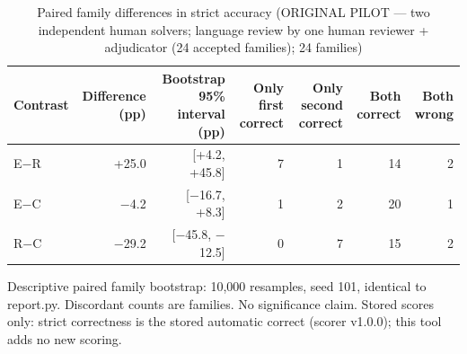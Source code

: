 \begin{table}[t]
\centering
\small
\caption{Paired family differences in strict accuracy (ORIGINAL PILOT --- two independent human solvers; language review by one human reviewer + adjudicator (24 accepted families); 24 families)}
\label{tab:pilotorig-Llama-3.2-3B-Instruct-paired}
\begin{tabular}{lrrrrrr}
\toprule
Contrast & Difference (pp) & Bootstrap 95\% interval (pp) & Only first correct & Only second correct & Both correct & Both wrong \\
\midrule
E$-$R & +25.0 & [+4.2, +45.8] & 7 & 1 & 14 & 2 \\
E$-$C & $-$4.2 & [$-$16.7, +8.3] & 1 & 2 & 20 & 1 \\
R$-$C & $-$29.2 & [$-$45.8, $-$12.5] & 0 & 7 & 15 & 2 \\
\bottomrule
\end{tabular}
\par\smallskip
\parbox{\linewidth}{\footnotesize Descriptive paired family bootstrap: 10,000 resamples, seed 101, identical to report.py. Discordant counts are families. No significance claim. Stored scores only: strict correctness is the stored automatic correct (scorer v1.0.0); this tool adds no new scoring.}
\end{table}
